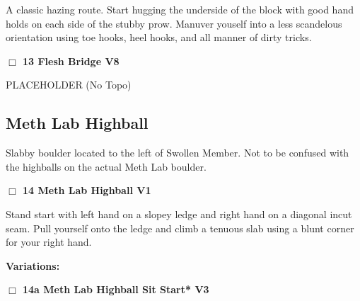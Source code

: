 \begin{multicols}{2}
\begin{adjustwidth}{1.3em}{}
A classic hazing route. Start hugging the underside of the block with good hand holds on each side of the stubby prow. Manuver youself into a less scandelous orientation using toe hooks, heel hooks, and  all manner of dirty tricks.
\end{adjustwidth}




\needspace{2em}
\label{rt:Flesh Bridge}
\colorbox{Goldenrod!20}{
\parbox{0.95\linewidth}{
\hspace{-1ex}\textbf{$\Box$
13 Flesh Bridge V8  
}}}
\begin{adjustwidth}{1.3em}{}			

PLACEHOLDER
  (No Topo)
\end{adjustwidth}





\needspace{10em}
\subsection*{Meth Lab Highball}\label{bf:Meth Lab Highball}

Slabby boulder located to the left of Swollen Member. Not to be confused with the highballs on the actual Meth Lab boulder.\\



\needspace{2em}
\label{rt:Meth Lab Highball}
\colorbox{green!20}{
\parbox{0.95\linewidth}{
\hspace{-1ex}\textbf{$\Box$
14 Meth Lab Highball V1  \warn
}}}
\begin{adjustwidth}{1.3em}{}			

Stand start with left hand on a slopey ledge and right hand on a diagonal incut seam. Pull yourself onto the ledge and climb a tenuous slab using a blunt corner for your right hand.
\end{adjustwidth}


\begin{adjustwidth}{0.5cm}{}				
\needspace{4em}
\textbf{Variations:} \newline

\needspace{2em}
\label{vr:Meth Lab Highball Sit Start}
\colorbox{green!20}{
\parbox{0.95\linewidth}{
\hspace{-1ex}\textbf{$\Box$
14a Meth Lab Highball Sit Start* V3  
}}}
\begin{adjustwidth}{1.3em}{}			


\end{adjustwidth}
\end{adjustwidth}
\end{multicols}
